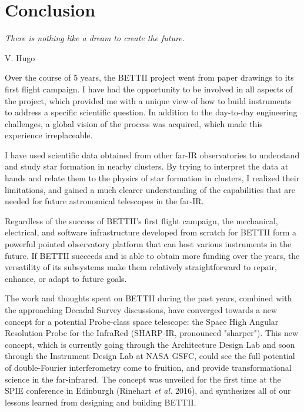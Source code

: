 
\chapter[Conclusion]{Conclusion} %
\label{chap:conclusion}


\epigraph{\small\itshape There is nothing like a dream to create the future.}{V. Hugo}


Over the course of 5 years, the BETTII project went from paper drawings to its first flight campaign. I have had the opportunity to be involved in all aspects of the project, which provided me with a unique view of how to build instruments to address a specific scientific question. In addition to the day-to-day engineering challenges, a global vision of the process was acquired, which made this experience irreplaceable.

I have used scientific data obtained from other far-IR observatories to understand and study star formation in nearby clusters. By trying to interpret the data at hands and relate them to the physics of star formation in clusters, I realized their limitations, and gained a much clearer understanding of the capabilities that are needed for future astronomical telescopes in the far-IR. 

Regardless of the success of BETTII's first flight campaign, the mechanical, electrical, and software infrastructure developed from scratch for BETTII form a powerful pointed observatory platform that can host various instruments in the future. If BETTII succeeds and is able to obtain more funding over the years, the versatility of its subsystems make them relatively straightforward to repair, enhance, or adapt to future goals.

The work and thoughts spent on BETTII during the past years, combined with the approaching Decadal Survey discussions, have converged towards a new concept for a potential Probe-class space telescope: the Space High Angular Resolution Probe for the InfraRed (SHARP-IR, pronounced "sharper"). This new concept, which is currently going through the Architecture Design Lab and soon through the Instrument Design Lab at NASA GSFC, could see the full potential of double-Fourier interferometry come to fruition, and provide transformational science in the far-infrared. The concept was unveiled for the first time at the SPIE conference in Edinburgh (Rinehart \textit{et al.} 2016), and synthesizes all of our lessons learned from designing and building BETTII.




